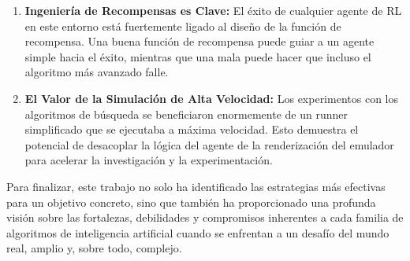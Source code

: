 \documentclass[12pt, oneside, openany]{book}
\begin{document}
\begin{enumerate}
    \item \textbf{Ingeniería de Recompensas es Clave:} El éxito de cualquier agente de RL en este entorno está fuertemente ligado al diseño de la función de recompensa. Una buena función de recompensa puede guiar a un agente simple hacia el éxito, mientras que una mala puede hacer que incluso el algoritmo más avanzado falle.
    \item \textbf{El Valor de la Simulación de Alta Velocidad:} Los experimentos con los algoritmos de búsqueda se beneficiaron enormemente de un runner simplificado que se ejecutaba a máxima velocidad. Esto demuestra el potencial de desacoplar la lógica del agente de la renderización del emulador para acelerar la investigación y la experimentación.
\end{enumerate}

\noindent Para finalizar, este trabajo no solo ha identificado las estrategias más efectivas para un objetivo concreto, sino que también ha proporcionado una profunda visión sobre las fortalezas, debilidades y compromisos inherentes a cada familia de algoritmos de inteligencia artificial cuando se enfrentan a un desafío del mundo real, amplio y, sobre todo, complejo.
\end{document}

